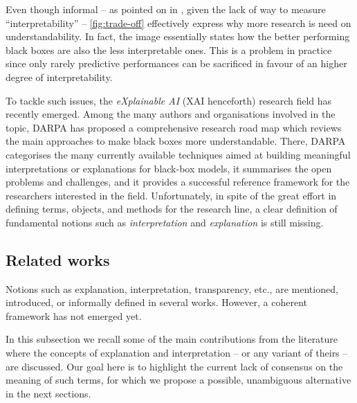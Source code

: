 \documentclass[12pt,a4paper,openright,twoside]{book}
\begin{document}
Even though informal -- as pointed on in \cite{Rudin2019}, given the lack of way to measure ``interpretability'' -- \cref{fig:trade-off} effectively express why more research is need on understandability.
%
In fact, the image essentially states how the better performing black boxes are also the less interpretable ones.
%
This is a problem in practice since only rarely predictive performances can be sacrificed in favour of an higher degree of interpretability.

To tackle such issues, the \emph{eXplainable AI} (XAI henceforth) research field has recently emerged.
%
Among the many authors and organisations involved in the topic, DARPA has proposed a comprehensive research road map \cite{darpa2016-xai} which reviews the main approaches to make black boxes more understandable.
%
There, DARPA categorises the many currently available techniques aimed at building meaningful interpretations or explanations for black-box models, it summarises the open problems and challenges, and it provides a successful reference framework for the researchers interested in the field.
%
Unfortunately, in spite of the great effort in defining terms, objects, and methods for the research line, a clear definition of fundamental notions such as \emph{interpretation} and \emph{explanation} is still missing.

\subsection{Related works}\label{ssec:related}

Notions such as explanation, interpretation, transparency, etc., are mentioned, introduced, or informally defined in several works.
%
However, a coherent framework has not emerged yet.

In this subsection we recall some of the main contributions from the literature where the concepts of explanation and interpretation -- or any variant of theirs -- are discussed.
%
Our goal here is to highlight the current lack of consensus on the meaning of such terms, for which we propose a possible, unambiguous alternative in the next sections.
\end{document}

